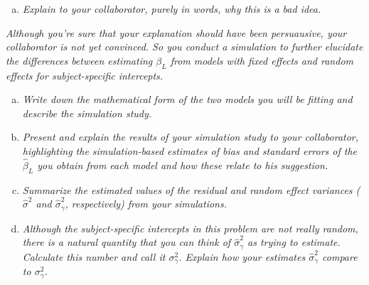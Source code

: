 \documentclass[11pt, letterpaper]{article}
\begin{document}
\begin{enumerate}[(a)]
\addtocounter{enumi}{1}
\item{\em   Explain to your collaborator, purely in words, why this is a bad idea.}

\end{enumerate}

{\em Although you're sure that your explanation should have been persuausive, your collaborator is not yet convinced.  So you conduct a simulation to 
further elucidate the differences between estimating $\beta_L$ from models with
fixed effects and random effects for subject-specific intercepts.  }
\begin{enumerate}[(a)]
\addtocounter{enumi}{2}
\item {\em Write down the mathematical form of the two models you will be fitting and describe the simulation study.}


\item {\em  Present and explain the results of your simulation study to your collaborator, highlighting the simulation-based estimates of bias and standard errors of the $\hat{\beta}_L$ you obtain from each model and how these relate to his suggestion.}


\item {\em  Summarize the estimated values of the residual and random effect variances ($\hat{\sigma}^2$ and $\hat{\sigma}^2_\gamma$, respectively) from your simulations.}


\item {\em  Although the subject-specific intercepts in this problem are not really random, there is a natural quantity that you can think of $\hat{\sigma}^2_\gamma$ as trying to estimate.  Calculate this number and call
it $\sigma_\gamma^2$.  Explain how your estimates $\hat{\sigma}^2_\gamma$ compare to  $\sigma_\gamma^2$.}

\end{enumerate}
\end{document}
